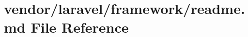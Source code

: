 \section{vendor/laravel/framework/readme.md File Reference}
\label{vendor_2laravel_2framework_2readme_8md}
